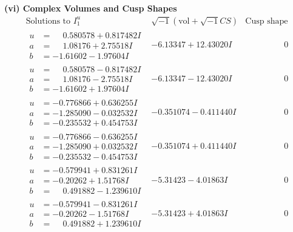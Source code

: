 \documentclass[1p]{elsarticle_modified}
\theoremstyle{definition}
\newcommand{\I}{\sqrt{-1}}
\begin{document}
\newpage\flushleft \textbf{(vi) Complex Volumes and Cusp Shapes}
$$\begin{array}{c|c|c}  
\text{Solutions to }I^u_{1}& \I (\text{vol} + \sqrt{-1}CS) & \text{Cusp shape}\\
 \hline 
\begin{aligned}
u &= \phantom{-}0.580578 + 0.817482 I \\
a &= \phantom{-}1.08176 + 2.75518 I \\
b &= -1.61602 - 1.97604 I\end{aligned}
 & -6.13347 + 12.43020 I & \phantom{-0.000000 } 0 \\ \hline\begin{aligned}
u &= \phantom{-}0.580578 - 0.817482 I \\
a &= \phantom{-}1.08176 - 2.75518 I \\
b &= -1.61602 + 1.97604 I\end{aligned}
 & -6.13347 - 12.43020 I & \phantom{-0.000000 } 0 \\ \hline\begin{aligned}
u &= -0.776866 + 0.636255 I \\
a &= -1.285090 - 0.032532 I \\
b &= -0.235532 + 0.454753 I\end{aligned}
 & -0.351074 - 0.411440 I & \phantom{-0.000000 } 0 \\ \hline\begin{aligned}
u &= -0.776866 - 0.636255 I \\
a &= -1.285090 + 0.032532 I \\
b &= -0.235532 - 0.454753 I\end{aligned}
 & -0.351074 + 0.411440 I & \phantom{-0.000000 } 0 \\ \hline\begin{aligned}
u &= -0.579941 + 0.831261 I \\
a &= -0.20262 + 1.51768 I \\
b &= \phantom{-}0.491882 - 1.239610 I\end{aligned}
 & -5.31423 - 4.01863 I & \phantom{-0.000000 } 0 \\ \hline\begin{aligned}
u &= -0.579941 - 0.831261 I \\
a &= -0.20262 - 1.51768 I \\
b &= \phantom{-}0.491882 + 1.239610 I\end{aligned}
 & -5.31423 + 4.01863 I & \phantom{-0.000000 } 0 \\ \hline\begin{aligned}

\end{aligned}
\end{array}$$
\end{document}
